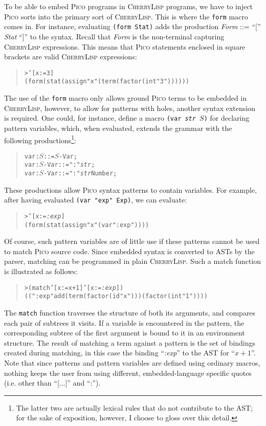 \documentclass[a4paper]{llncs}
\def\pico{\textsc{Pico}\xspace}
\def\cherrylisp{\textsc{CherryLisp}\xspace}
\def\mytextit#1{\textrm{\textit{#1}}}
\def\Var#1{\mytextit{#1}}
\begin{document}
To be able to embed \pico programs in \cherrylisp programs, we have to
inject \pico sorts into the primary sort of \cherrylisp. This is where
the \texttt{form} macro comes in. For instance, evaluating
\texttt{(form Stat)} adds the production \textit{Form} ::= ``$[$''
\textit{Stat} ``]'' to the syntax. Recall that \textit{Form} is the
non-terminal capturing \cherrylisp expressions. This means that \pico
statements enclosed in square brackets are valid \cherrylisp
expressions:
\begin{quote}
\begin{alltt}
> '[x := 3]
(form (stat (assign "x" (term (factor (int "3"))))))
\end{alltt}
\end{quote}
The use of the \texttt{form} macro only allows ground \pico terms to
be embedded in \cherrylisp, however, to allow for patterns with holes,
another syntax extension is required. One could, for instance, define
a macro \texttt{(var \textrm{\textit{str}} $S$)} for declaring pattern
variables, which, when evaluated, extends the grammar with the
following productions\footnote{The latter two are actually lexical
  rules that do not contribute to the AST; for the sake of exposition,
  however, I choose to gloss over this detail.}:
\begin{quote}
\begin{alltt}
var:\(S\)     ::= \(S\)-Var;
var:\(S\)-Var ::= ":" \mytextit{str};
var:\(S\)-Var ::= ":" \mytextit{str} Number;
\end{alltt}
\end{quote}
These productions allow \pico syntax patterns to contain
variables. For example, after having evaluated \texttt{(var "exp"
  Exp)}, we can evaluate:
\begin{quote}
\begin{alltt}
> '[x := \Var{:exp}]
(form (stat (assign "x" (var ":exp"))))
\end{alltt}
\end{quote}
Of course, such pattern variables are of little use if these patterns
cannot be used to match \pico source code. Since embedded syntax is
converted to ASTs by the parser, matching can be programmed in plain
\cherrylisp. Such a match function is illustrated as follows:
\begin{quote}
\begin{alltt}
> (match '[x := x + 1] '[x := \Var{:exp}])
((":exp" add (term (factor (id "x"))) (factor (int "1"))))
\end{alltt}
\end{quote}
The \texttt{match} function traverses the structure of both its
arguments, and compares each pair of subtrees it visits. If a variable
is encountered in the pattern, the corresponding subtree of the first
argument is bound to it in an environment structure.  The result of
matching a term against a pattern is the set of bindings created
during matching, in this case the binding ``\textit{:exp}'' to the AST
for ``$x + 1$''. Note that since patterns and pattern variables are
defined using ordinary macros, nothing keeps the user from using
different, embedded-language specific quotes (i.e. other than
``[...]''  and ``:'').
\end{document}

